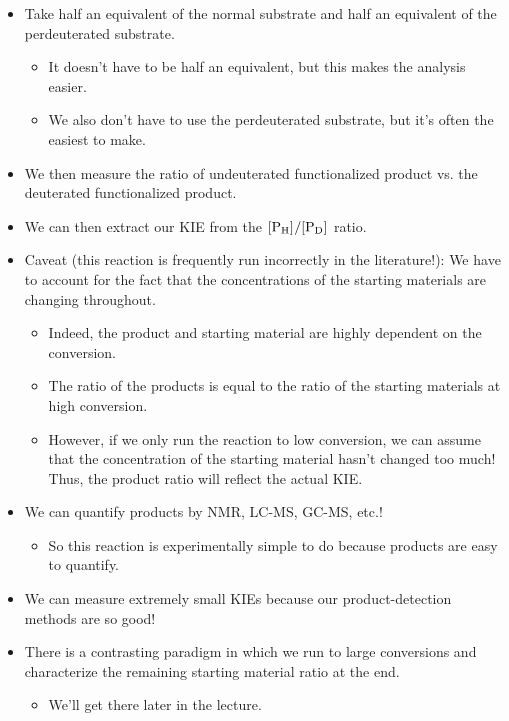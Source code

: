 \documentclass[../notes.tex]{subfiles}
\begin{document}
\begin{itemize}
\begin{itemize}
        \item Take half an equivalent of the normal substrate and half an equivalent of the perdeuterated substrate.
        \begin{itemize}
            \item It doesn't have to be half an equivalent, but this makes the analysis easier.
            \item We also don't have to use the perdeuterated substrate, but it's often the easiest to make.
        \end{itemize}
        \item We then measure the ratio of undeuterated functionalized product vs. the deuterated functionalized product.
        \item We can then extract our KIE from the $\cnc{P_H}/\cnc{P_D}$ ratio.
        \item Caveat (this reaction is frequently run incorrectly in the literature!): We have to account for the fact that the concentrations of the starting materials are changing throughout.
        \begin{itemize}
            \item Indeed, the product and starting material are highly dependent on the conversion.
            \item The ratio of the products is equal to the ratio of the starting materials at high conversion.
            \item However, if we only run the reaction to low conversion, we can assume that the concentration of the starting material hasn't changed too much! Thus, the product ratio will reflect the actual KIE.
        \end{itemize}
        \item We can quantify products by NMR, LC-MS, GC-MS, etc.!
        \begin{itemize}
            \item So this reaction is experimentally simple to do because products are easy to quantify.
        \end{itemize}
        \item We can measure extremely small KIEs because our product-detection methods are so good!
        \item There is a contrasting paradigm in which we run to large conversions and characterize the remaining starting material ratio at the end.
        \begin{itemize}
            \item We'll get there later in the lecture.

\end{itemize}
\end{itemize}
\end{itemize}
\end{document}
